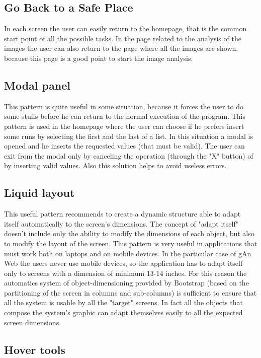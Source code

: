\subsection{Go Back to a Safe Place}
In each screen the user can easily return to the homepage, that is the common start point of all the possible tasks. In the page related to the analysis of the images the user can also return to the page where all the images are shown, because this page is a good point to start the image analysis.

\subsection{Modal panel}
This pattern is quite useful in some situation, because it forces the user to do some stuffs before he can return to the normal execution of the program. This pattern is used in the homepage where the user can choose if he prefers insert some runs by selecting the first and the last of a list. In this situation a modal is opened and he inserts the requested values (that must be valid). The user can exit from the modal only by canceling the operation (through the "X" button) of by inserting valid values. Also this solution helps to avoid useless errors. 

\subsection{Liquid layout}

This useful pattern recommends to create a dynamic structure able to adapt itself automatically to the screen's dimensions. The concept of "adapt itself" doesn't include only the ability to modify the dimensions of each object, but also to modify the layout of the screen. This pattern is very useful in applications that must work both on laptops and on mobile devices. In the particular case of gAn Web the users never use mobile devices, so the application has to adapt itself only to screens with a dimension of minimum 13-14 inches. For this reason the automatics system of object-dimensioning provided by Bootstrap (based on the partitioning of the screen in columns and sub-columns) is sufficient to ensure that all the system is usable by all the "target" screens. In fact all the objects that compose the system's graphic can adapt themselves easily to all the expected screen dimensions. 


\subsection{Hover tools}

